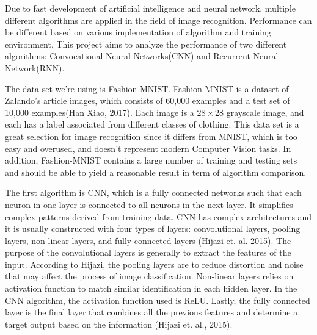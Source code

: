\documentclass[letterpaper]{article} %
\begin{document}
Due to fast development of artificial intelligence and neural network, multiple different algorithms are applied in the field of image recognition. Performance can be different based on various implementation of algorithm and training environment. This project aims to analyze the performance of two different algorithms: Convocational Neural Networks(CNN) and Recurrent Neural Network(RNN).

The data set we're using is Fashion-MNIST. Fashion-MNIST is a dataset of Zalando's article images, which consists of 60,000 examples and a test set of 10,000 examples(Han Xiao, 2017). Each image is a $28 \times 28$ grayscale image, and each has a label associated from different classes of clothing. This data set is a great selection for image recognition since it differs from MNIST, which is too easy and overused, and doesn't represent modern Computer Vision tasks. In addition, Fashion-MNIST contains a large number of training and testing sets and should be able to yield a reasonable result in term of algorithm comparison.

The first algorithm is CNN, which is a fully connected networks such that each neuron in one layer is connected to all neurons in the next layer. It simplifies complex patterns derived from training data. CNN has complex architectures and it is usually constructed with four types of layers: convolutional layers, pooling layers, non-linear layers, and fully connected layers (Hijazi et. al. 2015). The purpose of the convolutional layers is generally to extract the features of the input. According to Hijazi, the pooling layers are to reduce distortion and noise that may affect the process of image classification. Non-linear layers relies on activation function to match similar identification in each hidden layer. In the CNN algorithm, the activation function used is ReLU. Lastly, the fully connected layer is the final layer that combines all the previous features and determine a target output based on the information (Hijazi et. al., 2015). 
\end{document}
